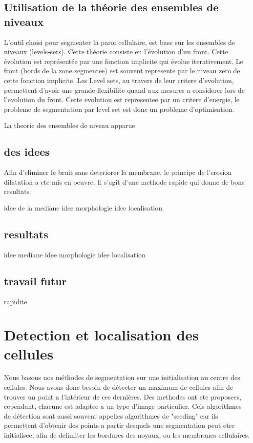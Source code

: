 \subsection{Utilisation de la théorie des ensembles de niveaux}

L'outil choisi pour segmenter la paroi cellulaire, est base sur les ensembles de niveaux (levels-sets). Cette théorie consiste en l'évolution d'un front. Cette évolution est représentée par une fonction implicite qui évolue iterativement. Le front (bords de la zone segmentee) est souvent represente par le niveau zero de cette fonction implicite.
Les Level sets, au travers de leur critere d'evolution, permettent d'avoir une grande flexibilite quand aux mesures a considerer lors de l'evolution du front. Cette evolution est representee par un critere d'energie, le probleme de segmentation par level set est donc un probleme d'optimisation.

La theorie des ensembles de niveau apparue
\subsection{des idees}
Afin d'eliminer le bruit sans deteriorer la membrane, le principe de l'erosion dilatation a ete mis en oeuvre. Il s'agit d'une methode rapide qui donne de bons resultats


idee de la mediane
idee morphologie
idee localisation
\subsection{resultats}
idee mediane
idee morphologie
idee localisation
\subsection{travail futur}
rapidite



\section{Detection et localisation des cellules}

Nous basons nos méthodes de segmentation sur une initialisation au centre des cellules. Nous avons donc besoin de détecter un maximum de cellules afin de trouver un point a l'intérieur de ces dernières. Des methodes ont ete proposees, cependant, chacune est adaptee a un type d'image particulier.
Cels algorithmes de détection sont aussi souvent appelles algorithmes de "seeding" car ils permettent d'obtenir des points a partir desquels une segmentation peut etre initialisee, afin de delimiter les bordures des noyaux, ou les membranes cellulaires.

